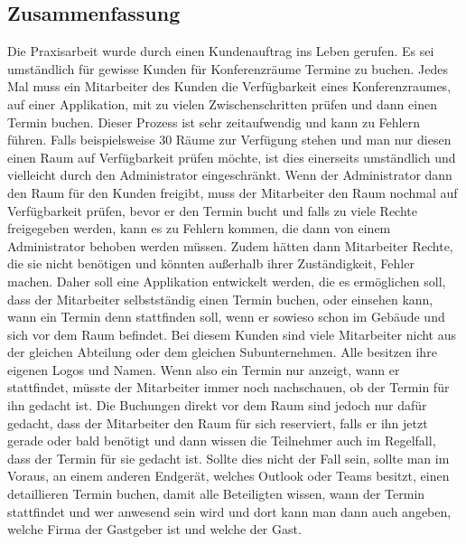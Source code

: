 
\subsection{Zusammenfassung}
Die Praxisarbeit wurde durch einen Kundenauftrag ins Leben gerufen.
Es sei umständlich für gewisse Kunden für Konferenzräume Termine zu buchen.
Jedes Mal muss ein Mitarbeiter des Kunden die Verfügbarkeit eines Konferenzraumes, auf einer Applikation, mit zu vielen Zwischenschritten prüfen und dann einen Termin buchen.
Dieser Prozess ist sehr zeitaufwendig und kann zu Fehlern führen.
Falls beispielsweise 30 Räume zur Verfügung stehen und man nur diesen einen Raum auf Verfügbarkeit prüfen möchte, ist dies einerseits umständlich und vielleicht durch den Administrator eingeschränkt.
Wenn der Administrator dann den Raum für den Kunden freigibt, muss der Mitarbeiter den Raum nochmal auf Verfügbarkeit prüfen, bevor er den Termin bucht und falls zu viele Rechte freigegeben werden, kann es zu Fehlern kommen,
die dann von einem Administrator behoben werden müssen.
Zudem hätten dann Mitarbeiter Rechte, die sie nicht benötigen und könnten außerhalb ihrer Zuständigkeit, Fehler machen.
\newline
Daher soll eine Applikation entwickelt werden, die es ermöglichen soll, dass der Mitarbeiter selbstständig einen Termin buchen, oder einsehen kann, wann ein Termin denn stattfinden soll, wenn er sowieso schon im Gebäude und sich vor dem Raum befindet.
\newline
Bei diesem Kunden sind viele Mitarbeiter nicht aus der gleichen Abteilung oder dem gleichen Subunternehmen.
Alle besitzen ihre eigenen Logos und Namen.
Wenn also ein Termin nur anzeigt, wann er stattfindet, müsste der Mitarbeiter immer noch nachschauen, ob der Termin für ihn gedacht ist.
Die Buchungen direkt vor dem Raum sind jedoch nur dafür gedacht, dass der Mitarbeiter den Raum für sich reserviert, falls er ihn jetzt gerade oder bald benötigt und dann wissen die Teilnehmer auch im Regelfall, dass der Termin für sie gedacht ist.
\newline
Sollte dies nicht der Fall sein, sollte man im Voraus, an einem anderen Endgerät, welches Outlook oder Teams besitzt, einen detaillieren Termin buchen, damit alle Beteiligten wissen, wann der Termin stattfindet und wer anwesend sein wird und dort kann man dann auch angeben, welche Firma der Gastgeber ist und welche der Gast.
